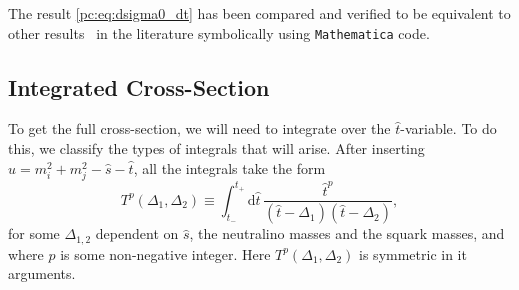 \documentclass[../main.tex]{subfiles}
\begin{document}
The result \cref{pc:eq:dsigma0_dt} has been compared and verified to be equivalent to other results~\cite{Debove:2010kf} in the literature symbolically using \verb|Mathematica| code.


\subsection{Integrated Cross-Section}
To get the full cross-section, we will need to integrate over the \(\hat{t}\)-variable.
To do this, we classify the types of integrals that will arise.
After inserting \(\hat{u} = m_i^2 + m_j^2 - \hat{s} - \hat{t}\), all the integrals take the form
\begin{equation}
  T^p(\Delta_1, \Delta_2) \equiv \int_{t_-}^{t_+} \!\mathrm{d}\hat{t}\,
  \frac{\hat{t}^p}{(\hat{t}-\Delta_1)(\hat{t}-\Delta_2)},
\end{equation}
for some \(\Delta_{1,2}\) dependent on \(\hat{s}\), the neutralino masses and
the squark masses, and where \(p\) is some non-negative integer.
Here \(T^p(\Delta_1, \Delta_2)\) is symmetric in it arguments.
\end{document}
